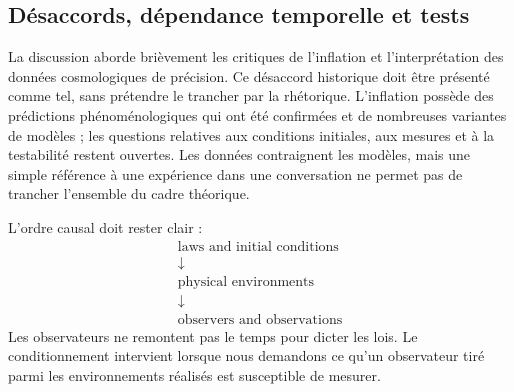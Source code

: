 \subsection{Désaccords, dépendance temporelle et tests}

La discussion aborde brièvement les critiques de l’inflation et l’interprétation des données cosmologiques de précision. Ce désaccord historique doit être présenté comme tel, sans prétendre le trancher par la rhétorique. L’inflation possède des prédictions phénoménologiques qui ont été confirmées et de nombreuses variantes de modèles ; les questions relatives aux conditions initiales, aux mesures et à la testabilité restent ouvertes. Les données contraignent les modèles, mais une simple référence à une expérience dans une conversation ne permet pas de trancher l’ensemble du cadre théorique.

\begin{classroomqa}
\end{classroomqa}

\begin{classroomqa}
\end{classroomqa}

L’ordre causal doit rester clair :
\begin{equation}
\begin{gathered}
\text{laws and initial conditions}\\[-0.15em]
\downarrow\\[-0.15em]
\text{physical environments}\\[-0.15em]
\downarrow\\[-0.15em]
\text{observers and observations}
\end{gathered}
\end{equation}
Les observateurs ne remontent pas le temps pour dicter les lois. Le conditionnement intervient lorsque nous demandons ce qu’un observateur tiré parmi les environnements réalisés est susceptible de mesurer.

